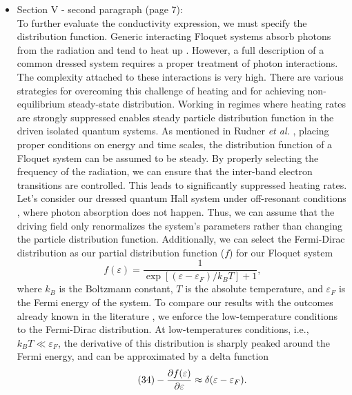\documentclass{article}
\begin{document}
\begin{itemize}
  \item Section V - second paragraph (page 7):\\
  {\color{Red}
  To further evaluate the conductivity expression, we must specify the distribution function. Generic interacting Floquet systems absorb photons from the radiation and tend to heat up \cite{seetharam2019,rudner2020}.
  However, a full description of a common dressed system requires a proper treatment of photon interactions. The complexity attached to these interactions is very high. There are various strategies \cite{lindner2017,bukov2015,eckardt2015,kuwahara2016,abanin2017,mori2018,rudner2020} for overcoming this challenge of heating and for achieving non-equilibrium steady-state distribution. Working in regimes where heating rates are strongly suppressed enables steady particle distribution function in the driven isolated quantum systems.
  As mentioned in Rudner \textit{et al.} \cite{rudner2020}, placing proper conditions on energy and time scales, the distribution function of a Floquet system can be assumed to be steady. By properly selecting the frequency of the radiation, we can ensure that the inter-band electron transitions are controlled. This leads to significantly suppressed heating rates.
  Let's consider our dressed quantum Hall system under off-resonant conditions \cite{rudner2020,wackerlthesis20}, where photon absorption does not happen. Thus, we can assume that the driving field only renormalizes the system's parameters rather than changing the particle distribution function.
  Additionally, we can select the Fermi-Dirac distribution as our partial distribution function ($f$) for our Floquet system
  \begin{equation} \tag{33}
    f(\varepsilon) = \frac{1}{\exp[(\varepsilon - \varepsilon_F)/k_B T]+1},
  \end{equation}
  where $k_B$ is the Boltzmann constant, $T$ is the absolute temperature, and $\varepsilon_F$ is the Fermi energy of the system. To compare our results with the outcomes already known in the literature \cite{dini16,endo09}, we enforce the low-temperature conditions to the Fermi-Dirac distribution.
  At low-temperatures conditions, i.e., $k_BT \ll \varepsilon_F$, the derivative of this distribution is sharply peaked around the Fermi energy, and can be approximated by a delta function \cite{endo09}
  \begin{equation} \tag{34}
    - \pdv{f(\varepsilon)}{\varepsilon} \approx \delta(\varepsilon - \varepsilon_F).
  \end{equation}
  }
\end{itemize}
\end{document}
